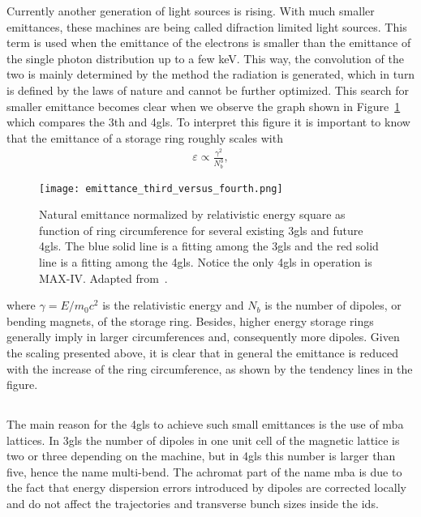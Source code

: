     Currently another generation of light sources is rising. With much smaller emittances, these machines are being called difraction limited light sources. This term is used when the emittance of the electrons is smaller than the emittance of the single photon distribution up to a few \si{\kilo\electronvolt}. This way, the convolution of the two is mainly determined by the method the radiation is generated, which in turn is defined by the laws of nature and cannot be further optimized. This search for smaller emittance becomes clear when we observe the graph shown in Figure~\ref{fig:scaled_emittances} which compares the 3th and \gls{4gls}. To interpret this figure it is important to know that the emittance of a storage ring roughly scales with
    \begin{align}
        \varepsilon \propto \frac{\gamma^2}{N_b^3},
    \end{align}
    \begin{figure}[b!]
        \center
        \texttt{[image: emittance\_third\_versus\_fourth.png]}
        \caption[Comparison of machines emittances.]{Natural emittance normalized by relativistic energy square as function of ring circumference for several existing \gls{3gls} and future \gls{4gls}. The blue solid line is a fitting among the \gls{3gls} and the red solid line is a fitting among the \gls{4gls}. Notice the only \gls{4gls} in operation is MAX-IV. Adapted from~\cite{Liu2017}.}
        \label{fig:scaled_emittances}
    \end{figure}
    where $\gamma = E/m_0c^2$ is the relativistic energy and $N_b$ is the number of dipoles, or bending magnets, of the storage ring. Besides, higher energy storage rings generally imply in larger circumferences and, consequently more dipoles. Given the scaling presented above, it is clear that in general the emittance is reduced with the increase of the ring circumference, as shown by the tendency lines in the figure.

\subsection{}

    The main reason for the \gls{4gls} to achieve such small emittances is the use of \gls{mba} lattices. In \gls{3gls} the number of dipoles in one unit cell of the magnetic lattice is two or three depending on the machine, but in \gls{4gls} this number is larger than five, hence the name multi-bend. The achromat part of the name \gls{mba} is due to the fact that energy dispersion errors introduced by dipoles are corrected locally and do not affect the trajectories and transverse bunch sizes inside the \gls{ids}.

